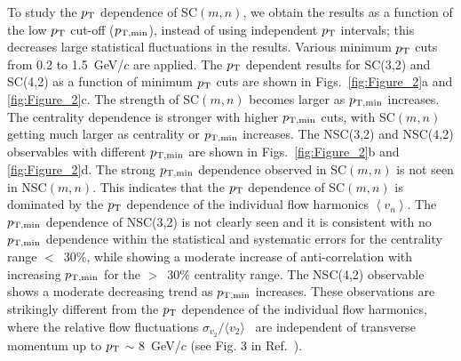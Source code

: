 To study the $p_{\rm T}$ dependence of SC$(m,n)$, we obtain the results as a function of the low $p_{\rm T}$ cut-off ($p_{\rm T, min}$), instead of using independent $p_{\rm T}$ intervals; this decreases large statistical fluctuations in the results. Various minimum $p_{\rm T}$ cuts from 0.2 to 1.5~GeV/$c$ are applied.
The $p_{\rm T}$ dependent results for SC(3,2) and SC(4,2) as a function of minimum $p_{\rm T}$ cuts are shown in Figs.~\ref{fig:Figure_2}a and \ref{fig:Figure_2}c.
The strength of SC$(m,n)$ becomes larger as $p_{\rm T, min}$ increases. 
The centrality dependence is stronger with higher $p_{\rm T, min}$ cuts, with SC$(m,n)$ getting much larger as centrality or $p_{\rm T, min}$ increases. 
The NSC(3,2) and NSC(4,2) observables with different $p_{\rm T, min}$ are shown in Figs.~\ref{fig:Figure_2}b and \ref{fig:Figure_2}d.
The strong $p_{\rm T, min}$ dependence observed in SC$(m,n)$ is not seen in NSC$(m,n)$. 
This indicates that the $p_{\rm T}$ dependence of SC$(m,n)$ is dominated by the $p_{\rm T}$  dependence of the individual flow harmonics $\left<v_n\right>$. 
The $p_{\rm T, min}$ dependence of NSC(3,2) is not clearly seen and it is consistent with no $p_{\rm T, min}$ dependence within the statistical and systematic errors for the centrality range $<$~30\%, while showing a moderate increase of anti-correlation with increasing $p_{\rm T, min}$ for the $>$~30\% centrality range.
The NSC(4,2) observable shows a moderate decreasing trend as $p_{\rm T, min}$ increases. These observations are strikingly different from the $p_{\rm T}$ dependence of the individual flow harmonics, where the relative flow fluctuations $\sigma_{v_2}/\langle v_{2} \rangle$~\cite{Voloshin:2008dg} are independent of transverse momentum up to $p_{\rm T}$ $\sim$ 8~GeV/$c$ (see Fig. 3 in Ref.~\cite{Abelev:2012di}).

